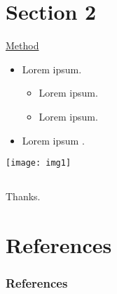 \documentclass{beamer}
\begin{document}
\section{Section 2}
\begin{frame}
\begin{center}
\underline{Method}\\
\end{center}
\begin{itemize}
\item Lorem ipsum.
	\begin{itemize}
	\item Lorem ipsum.
	\item Lorem ipsum.
	\end{itemize}
\item Lorem ipsum \cite{RN1}.
\end{itemize}
\begin{center}
\texttt{[image: img1]}
\end{center}
\end{frame}

\subsection*{}
\begin{frame}
\begin{center}
Thanks.
\end{center}
\end{frame}

\section*{References}
\begin{frame}[allowframebreaks]
\frametitle{References}


\end{frame}
\end{document}
